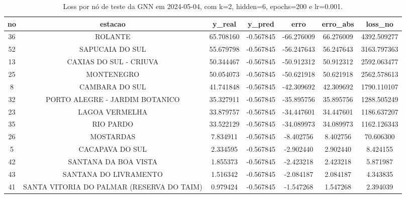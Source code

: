 \begin{table}[h]
\centering
\caption{Loss por nó de teste da GNN em 2024-05-04, com k=2, hidden=6, epochs=200 e lr=0.001.}
\label{tab:gnn_loss_nodes_k2_hidden6}
\begin{tabular}{ccccccc}
\toprule
no & estacao & y\_real & y\_pred & erro & erro\_abs & loss\_no \\
\midrule
36 & ROLANTE & 65.708160 & -0.567845 & -66.276009 & 66.276009 & 4392.509277 \\
52 & SAPUCAIA DO SUL & 55.679798 & -0.567845 & -56.247643 & 56.247643 & 3163.797363 \\
13 & CAXIAS DO SUL - CRIUVA & 50.344467 & -0.567845 & -50.912312 & 50.912312 & 2592.063477 \\
25 & MONTENEGRO & 50.054073 & -0.567845 & -50.621918 & 50.621918 & 2562.578613 \\
8 & CAMBARA DO SUL & 41.741848 & -0.567845 & -42.309692 & 42.309692 & 1790.110107 \\
32 & PORTO ALEGRE - JARDIM BOTANICO & 35.327911 & -0.567845 & -35.895756 & 35.895756 & 1288.505249 \\
23 & LAGOA VERMELHA & 33.879757 & -0.567845 & -34.447601 & 34.447601 & 1186.637207 \\
35 & RIO PARDO & 33.522129 & -0.567845 & -34.089973 & 34.089973 & 1162.126343 \\
26 & MOSTARDAS & 7.834911 & -0.567845 & -8.402756 & 8.402756 & 70.606300 \\
5 & CACAPAVA DO SUL & 2.334595 & -0.567845 & -2.902440 & 2.902440 & 8.424155 \\
42 & SANTANA DA BOA VISTA & 1.855373 & -0.567845 & -2.423218 & 2.423218 & 5.871987 \\
43 & SANTANA DO LIVRAMENTO & 1.516342 & -0.567845 & -2.084187 & 2.084187 & 4.343835 \\
41 & SANTA VITORIA DO PALMAR (RESERVA DO TAIM) & 0.979424 & -0.567845 & -1.547268 & 1.547268 & 2.394039 \\
\bottomrule
\end{tabular}
\end{table}
